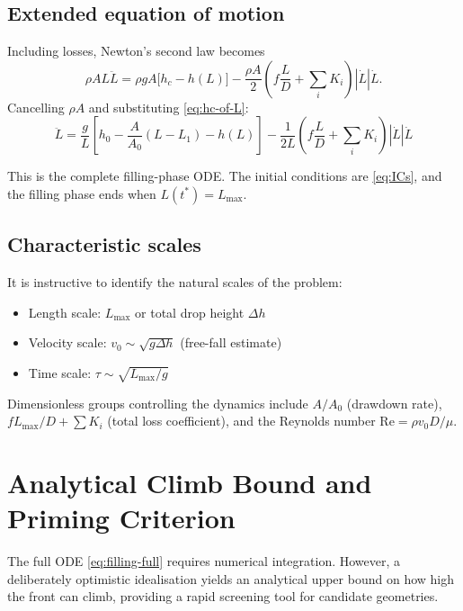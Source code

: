 \documentclass[11pt]{article}
\theoremstyle{definition}
\begin{document}
\subsection{Extended equation of motion}

Including losses, Newton's second law becomes
\[
  \rho A L \ddot{L} = \rho g A\bigl[h_c - h(L)\bigr] 
                     - \frac{\rho A}{2}\left(f \frac{L}{D} + \sum_i K_i\right) |\dot{L}| \dot{L}.
\]
Cancelling $\rho A$ and substituting \eqref{eq:hc-of-L}:
\begin{equation}
  \boxed{\ddot{L} = \frac{g}{L}\left[h_0 - \frac{A}{A_0}(L - L_1) - h(L)\right]
         - \frac{1}{2L}\left(f \frac{L}{D} + \sum_i K_i\right) |\dot{L}| \dot{L}}
  \label{eq:filling-full}
\end{equation}

This is the complete filling-phase ODE. The initial conditions are \eqref{eq:ICs}, and 
the filling phase ends when $L(t^*) = L_{\max}$.

\subsection{Characteristic scales}

It is instructive to identify the natural scales of the problem:
\begin{itemize}[nosep]
  \item Length scale: $L_{\max}$ or total drop height $\Delta h$
  \item Velocity scale: $v_0 \sim \sqrt{g \Delta h}$ (free-fall estimate)
  \item Time scale: $\tau \sim \sqrt{L_{\max}/g}$
\end{itemize}
Dimensionless groups controlling the dynamics include $A/A_0$ (drawdown rate), 
$fL_{\max}/D + \sum K_i$ (total loss coefficient), and the Reynolds number 
$\text{Re} = \rho v_0 D/\mu$.

\section{Analytical Climb Bound and Priming Criterion}
\label{sec:bounds}

The full ODE \eqref{eq:filling-full} requires numerical integration. However, a deliberately 
optimistic idealisation yields an analytical upper bound on how high the front can climb, 
providing a rapid screening tool for candidate geometries.
\end{document}
